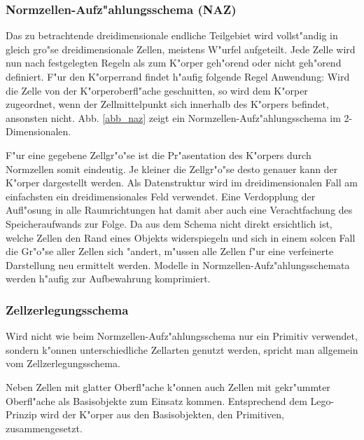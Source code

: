 \subsubsection[Normzellen-Aufz"ahlungsschema]{%
    Normzellen-Aufz"ahlungsschema (NAZ)}
\label{normzellen}
{
\let\mywidth=\linewidth
\parbox[t]{0.7\mywidth}{%
    Das zu betrachtende dreidimensionale endliche Teilgebiet wird vollst"andig 
    in gleich gro"se dreidimensionale Zellen, meistens W"urfel aufgeteilt. 
    Jede Zelle wird nun nach festgelegten Regeln als zum K"orper geh"orend 
    oder nicht geh"orend definiert. F"ur den K"orperrand findet h"aufig 
    folgende Regel Anwendung: Wird die Zelle von der K"orperoberfl"ache 
    geschnitten, so wird dem K"orper zugeordnet, wenn der Zellmittelpunkt sich 
    innerhalb des K"orpers befindet, ansonsten nicht. Abb. \ref{abb_naz} 
    zeigt ein Normzellen-Aufz"ahlungsschema im 2-Dimensionalen. 
}
\hspace{1em}
\parbox[t][4.5cm][c]{0.25\mywidth}{}
F"ur eine gegebene Zellgr"o"se ist die Pr"asentation des K"orpers durch 
Normzellen somit eindeutig. Je kleiner die Zellgr"o"se
desto genauer kann der K"orper dargestellt werden. Als Datenstruktur wird 
im dreidimensionalen Fall am einfachsten ein dreidimensionales Feld verwendet. 
Eine Verdopplung der Aufl"osung in alle Raumrichtungen hat damit aber auch 
eine Verachtfachung des Speicheraufwands zur Folge. 
Da aus dem Schema nicht direkt ersichtlich ist, welche Zellen den Rand 
eines Objekts widerspiegeln und sich in einem solcen Fall die Gr"o"se 
aller Zellen sich "andert, m"ussen alle Zellen f"ur eine 
verfeinerte Darstellung neu ermittelt werden.
Modelle in Normzellen-Aufz"ahlungsschemata werden h"aufig zur Aufbewahrung 
komprimiert.

\subsubsection{Zellzerlegungsschema}
{
\let\mywidth=\linewidth
\parbox[t]{0.5\mywidth}{%
    Wird nicht wie beim Normzellen-Aufz"ahlungsschema nur ein Primitiv 
    verwendet, sondern k"onnen unterschiedliche Zellarten genutzt werden, 
    spricht man allgemein vom Zellzerlegungsschema. 
}
\hspace{1em}
\parbox[t][2cm][c]{0.45\mywidth}{}
}

Neben Zellen mit glatter Oberfl"ache k"onnen auch Zellen mit gekr"ummter 
Oberfl"ache als Basisobjekte zum Einsatz kommen. 
Entsprechend dem Lego-Prinzip wird der K"orper aus den Basisobjekten, 
den Primitiven, zusammengesetzt. 

}
